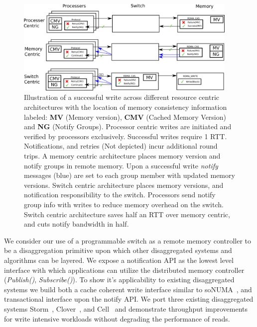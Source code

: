 \begin{figure}
      \centering
      \includegraphics[width=0.95\textwidth]{fig/notify.png}
      \caption{Illustration of a successful write across different
      resource centric architectures with the location of memory
      consistency information labeled: \textbf{MV} (Memory version),
      \textbf{CMV} (Cached Memory Version) and \textbf{NG} (Notify
      Groups). Processor centric writes are
      initiated and verified by processors exclusively. Successful
      writes require 1 RTT. Notifications, and retries (Not depicted)
    incur additional round trips. A memory centric architecture places
    memory version and notify groups in remote memory. Upon a
    successful write \textit{notify} messages (blue) are set to each
    group member with updated memory versions. Switch centric
    architecture places memory versions, and notification
    responsibility to the switch. Processors send notify group info
    with writes to reduce memory overhead on the switch. Switch
    centric architecture saves half an RTT over memory centric, and
    cuts notify bandwidth in half.}
      \label{fig:notify}
\end{figure}


We consider our use of a programmable switch as a remote memory
controller to be a disaggregation primitive upon which other
disaggregated systems and algorithms can be layered. We expose a
notification API as the lowest level interface with which applications
can utilize the distributed memory controller (\textit{Publish()},
\textit{Subscribe()}). To show it's applicability to existing
disaggregated systems we build both a cache coherent write interface
similar to soNUMA~\cite{sonuma}, and transactional interface upon the
notify API. We port three existing disaggregated systems
Storm~\cite{storm}, Clover~\cite{clover}, and Cell~\cite{cell} and
demonstrate throughput improvements for write intensive workloads
without degrading the performance of reads.

